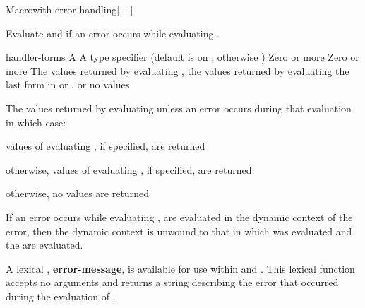 \documentclass[10pt,twoside,english,pdftex]{article}
\begin{document}
\begin{functiondoc}{Macro}{with-error-handling}{[ \vbar{}
    \code{(} \mbox{[ \code{)}]}
       \superstar{}\code{)}
    \superstar{} 
    \returns{} \superstar} 
%
%
%  
%  
\fnsyntax

\fnpurpose Evaluate  and  if an error
occurs while evaluating .

\fnpackage {}

\fnmodule {}

\fnargs
\begin{args}{handler-forms}
\arg[form] A 
\arg[type] A type specifier (default is \mbox{} on ; 
  otherwise )
 Zero or more 
 Zero or more 
\arg[results] The values returned by evaluating , the values
  returned by evaluating the last form in  or
  , or no values
\end{args}

\fnreturns The values returned by evaluating  unless an
error occurs during that evaluation in which case:
\begin{tightitemize}
\item values of evaluating , if specified, are returned
\item otherwise, values of evaluating , if specified, are returned
\item otherwise, no values are returned
\end{tightitemize}

\fndescription If an error occurs while evaluating ,
 are evaluated in the dynamic context of the error, then
the dynamic context is unwound to that in which  was evaluated and
the  are evaluated.

A lexical , \textbf{error-message}, is available for use
within  and .  This lexical function
accepts no arguments and returns a string describing the error that occurred
during the evaluation of .


\end{functiondoc}
\end{document}
